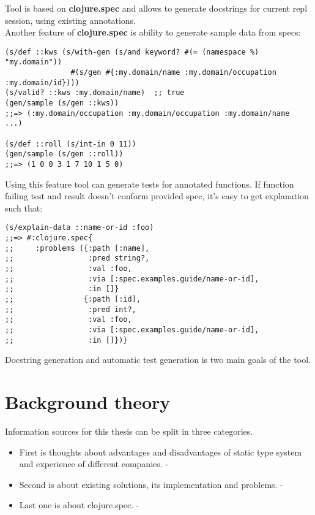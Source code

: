 \documentclass[12pt,a4paper]{report}
\begin{document}
Tool is based on \textbf{clojure.spec} and allows to generate docstrings for current
repl session, using existing annotations. \\

Another feature of \textbf{clojure.spec} is ability to generate sample data from
specs:

\begin{verbatim}
(s/def ::kws (s/with-gen (s/and keyword? #(= (namespace %) "my.domain"))
               #(s/gen #{:my.domain/name :my.domain/occupation :my.domain/id})))
(s/valid? ::kws :my.domain/name)  ;; true
(gen/sample (s/gen ::kws))
;;=> (:my.domain/occupation :my.domain/occupation :my.domain/name  ...)

(s/def ::roll (s/int-in 0 11))
(gen/sample (s/gen ::roll))
;;=> (1 0 0 3 1 7 10 1 5 0)
\end{verbatim}

Using this feature tool can generate tests for annotated functions. If function
failing test and result doesn't conform provided spec, it's easy to get
explanation such that:

\begin{verbatim}
(s/explain-data ::name-or-id :foo)
;;=> #:clojure.spec{
;;     :problems ({:path [:name],
;;                 :pred string?,
;;                 :val :foo,
;;                 :via [:spec.examples.guide/name-or-id],
;;                 :in []}
;;                {:path [:id],
;;                 :pred int?,
;;                 :val :foo,
;;                 :via [:spec.examples.guide/name-or-id],
;;                 :in []})}
\end{verbatim}

Docstring generation and automatic test generation is two main goals of the tool.

\section*{Background theory}

Information sources for this thesis can be split in three categories.\\

\begin{itemize}
\item First is thoughts about advantages and disadvantages of static type system
and experience of different companies. \cite{coldwar} - \cite{statictypingadv}
\item Second is about existing solutions, its implementation and problems.
  \cite{contracts} - \cite{typedscheme}
\item Last one is about clojure.spec. \cite{customdefn} - \cite{baremetal}
\end{itemize}
\end{document}

